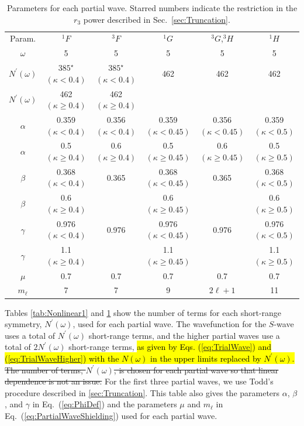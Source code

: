 \documentclass[preprint,showpacs,showkeys,preprintnumbers,amsmath,amssymb,longbibliography,pra,aps]{revtex4-1}
\begin{document}
\begin{table}[H]
  \centering
	\begin{ruledtabular}
    \begin{tabular}{cccccc}
    Param. & $^1F$ & $^3F$ & $^1G$ & $^3G$,$^3H$ & $^1H$ \\
    \colrule
	$\omega$           & 5 & 5 & 5 & 5 & 5 \\
	$N^\prime(\omega)$ & $385^\star$ $(\kappa < 0.4)$ & $385^\star$ $(\kappa < 0.4)$  & 462  & 462 & 462 \\
	$N^\prime(\omega)$ & 462 $(\kappa \geq 0.4)$ &  462 $(\kappa \geq 0.4)$  &  &  & \\
	$\alpha$           & 0.359 $(\kappa < 0.4)$ & 0.356 $(\kappa < 0.4)$ & 0.359 $(\kappa < 0.45)$ & 0.356 $(\kappa < 0.45)$ & 0.359 $(\kappa < 0.5)$  \\
	$\alpha$           & 0.5 $(\kappa \geq 0.4)$ & 0.6 $(\kappa \geq 0.4)$ & 0.5 $(\kappa \geq 0.45)$ & 0.6 $(\kappa \geq 0.45)$ & 0.5 $(\kappa \geq 0.5)$ \\
	$\beta$            & 0.368 $(\kappa < 0.4)$ & 0.365  & 0.368 $(\kappa < 0.45)$ & 0.365 & 0.368 $(\kappa < 0.5)$ \\
	$\beta$            & 0.6 $(\kappa \geq 0.4)$ &   & 0.6 $(\kappa \geq 0.45)$ &  & 0.6 $(\kappa \geq 0.5)$ \\
	$\gamma$           & 0.976 $(\kappa < 0.4)$ & 0.976 & 0.976 $(\kappa < 0.45)$ & 0.976  & 0.976 $(\kappa < 0.5)$ \\
	$\gamma$           & 1.1 $(\kappa \geq 0.4)$ &  & 1.1 $(\kappa \geq 0.45)$ &  & 1.1 $(\kappa \geq 0.5)$ \\
	$\mu$              & 0.7  & 0.7 & 0.7  & 0.7 & 0.7 \\
	$m_\ell$           & 7    & 7   & 9    & $2\ell+1$  & 11 \\
    \end{tabular}
  \end{ruledtabular}
  \caption{Parameters for each partial wave. Starred numbers indicate the
restriction in the $r_3$ power described in Sec.~\ref{sec:Truncation}.}
  \label{tab:Nonlinear2}
\end{table}

Tables \ref{tab:Nonlinear1} and \ref{tab:Nonlinear2} show
the number of terms for each short-range 
symmetry, $N^\prime(\omega)$, used for each partial wave. The wavefunction
for the $S$-wave uses a 
total of $N^\prime(\omega)$ short-range terms, and the higher partial waves 
use a total of $2 N^\prime(\omega)$ short-range terms, \hl{as given by Eqs.
{(\ref{eq:TrialWave})} and {(\ref{eq:TrialWaveHigher})} with the 
$N(\omega)$ in the upper limits replaced by $N^\prime(\omega)$.}
\sout{The number of terms, $N^\prime(\omega)$, is chosen for each partial wave so
that linear dependence is not an issue.} For the first three partial waves,
we use Todd's procedure described in \ref{sec:Truncation}.
This table also gives the parameters $\alpha$, $\beta$, and
$\gamma$ in Eq.~(\ref{eq:PhiDef}) and the parameters $\mu$ and $m_\ell$ in 
Eq.~(\ref{eq:PartialWaveShielding}) used for each partial wave.
\end{document}
